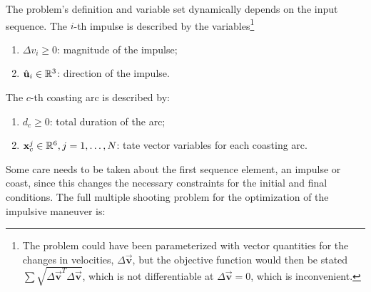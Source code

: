 The problem's definition and variable set dynamically depends on the input sequence. The \(i\)-th impulse is described by the variables\footnote{The problem could have been parameterized with vector quantities for the changes in velocities, \(\Delta \vec{\mathbf{v}}\), but the objective function would then be stated \(\sum \sqrt{\Delta \vec{\mathbf{v}}^T \Delta \vec{\mathbf{v}}}\), which is not differentiable at \(\Delta \vec {\mathbf{v}} = 0\), which is inconvenient.}
\begin{enumerate}
    \item \(\Delta v_i \geq 0\): magnitude of the impulse;
    \item \(\hat{\mathbf{u}}_i \in \mathbb{R}^3\): direction of the impulse.
\end{enumerate}

The \(c\)-th coasting arc is described by:
\begin{enumerate}
    \item \(d_c \geq 0\): total duration of the arc;
    \item \(\mathbf{x}^j_c \in \mathbb{R}^6, j=1,\dots,N\): tate vector variables for each coasting arc. 
\end{enumerate}

Some care needs to be taken about the first sequence element, an impulse or coast, since this changes the necessary constraints for the initial and final conditions. The full multiple shooting problem for the optimization of the impulsive maneuver is:

